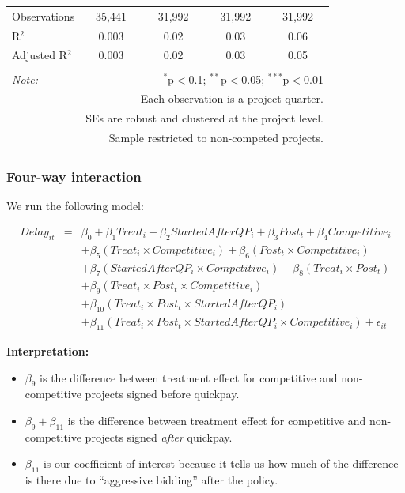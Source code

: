 \documentclass[]{article}
\providecommand{\tightlist}{%
  \setlength{\itemsep}{0pt}\setlength{\parskip}{0pt}}
\begin{document}
\begin{table}[H]
\begin{tabular}{@{\extracolsep{-2pt}}lcccc}
Observations & 35,441 & 31,992 & 31,992 & 31,992 \\ 
R$^{2}$ & 0.003 & 0.02 & 0.03 & 0.06 \\ 
Adjusted R$^{2}$ & 0.003 & 0.02 & 0.03 & 0.05 \\ 
\hline 
\hline \\[-1.8ex] 
\textit{Note:}  & \multicolumn{4}{r}{$^{*}$p$<$0.1; $^{**}$p$<$0.05; $^{***}$p$<$0.01} \\ 
 & \multicolumn{4}{r}{Each observation is a project-quarter.} \\ 
 & \multicolumn{4}{r}{SEs are robust and clustered at the project level.} \\ 
 & \multicolumn{4}{r}{Sample restricted to non-competed projects.} \\ 
\end{tabular} 
\end{table}

\hypertarget{four-way-interaction}{%
\subsubsection{Four-way interaction}\label{four-way-interaction}}

We run the following model:

\[\begin{aligned} Delay_{it} &=& \beta_0 +\beta_1 Treat_i+ \beta_2 StartedAfterQP_i+ \beta_3 Post_t+ \beta_4 Competitive_i\\ && +  \beta_5 (Treat_i \times Competitive_i) + \beta_6 (Post_t \times Competitive_i)\\ && +  \beta_7 (StartedAfterQP_i \times Competitive_i) +\beta_8 (Treat_i \times Post_t)\\ && + \beta_9 (Treat_i \times Post_t \times Competitive_i) \\ && + \beta_{10} (Treat_i \times Post_t \times StartedAfterQP_i )\\ && + \beta_{11} (Treat_i \times Post_t \times StartedAfterQP_i \times Competitive_i) + \epsilon_{it} \end{aligned}\]

\textbf{Interpretation:}

\begin{itemize}
\tightlist
\item
  \(\beta_9\) is the difference between treatment effect for competitive
  and non-competitive projects signed before quickpay.
\item
  \(\beta_9 + \beta_{11}\) is the difference between treatment effect
  for competitive and non-competitive projects signed \emph{after}
  quickpay.
\item
  \(\beta_{11}\) is our coefficient of interest because it tells us how
  much of the difference is there due to ``aggressive bidding'' after
  the policy.
\end{itemize}
\end{document}
